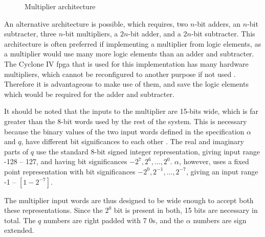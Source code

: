 \begin{figure}[ht]
	\caption{Multiplier architecture}
	\label{fig:mult-arch}
\end{figure}


An alternative architecture is possible, which requires, two $n$-bit adders, an $n$-bit subtracter, three $n$-bit multipliers, a $2n$-bit adder, and a $2n$-bit subtracter. This architecture is often preferred if implementing a multiplier from logic elements, as a multiplier would use many more logic elements than an adder and subtracter. The Cyclone IV \gls{fpga} that is used for this implementation has many hardware multipliers, which cannot be reconfigured to another purpose if not used \cite[p.4-1]{altera2016}. Therefore it is advantageous to make use of them, and save the logic elements which would be required for the adder and subtracter.

It should be noted that the inputs to the multiplier are 15-bits wide, which is far greater than the 8-bit words used by the rest of the system. This is necessary because the binary values of the two input words defined in the specification $\alpha$ and $q$, have different bit significances to each other \cite{kazmierski2017}. The real and imaginary parts of $q$ use the standard 8-bit signed integer representation, giving input range -128 -- 127, and having bit significances $-2^7,2^6,...,2^0$. $\alpha$, however, uses a fixed point representation with bit significances $-2^0,2^{-1},...,2^{-7}$, giving an input range -1 -- $[1-2^{-7}]$.

The multiplier input words are thus designed to be wide enough to accept both these representations. Since the $2^0$ bit is present in both, 15 bits are necessary in total. The $q$ numbers are right padded with 7 0s, and the $\alpha$ numbers are sign extended.

